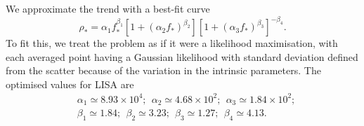 We approximate the trend with a best-fit curve
\begin{equation}
\rho_\ast = \alpha_1 f_\ast^{\beta_1} \left[1 + \left(\alpha_2 f_\ast\right)^{\beta_2}\right]\left[1 + \left(\alpha_3 f_\ast\right)^{\beta_3}\right]^{-\beta_4}.
\label{eq:scaled-SNR}
\end{equation}
To fit this, we treat the problem as if it were a likelihood maximisation, with each averaged point having a Gaussian likelihood with standard deviation defined from the scatter because of the variation in the intrinsic parameters. The optimised values for LISA are
\begin{equation}
\begin{split}
&\alpha_1 \simeq 8.93 \times 10^4; \ \  \alpha_2 \simeq 4.68 \times 10^2; \ \  \alpha_3 \simeq 1.84 \times 10^2;\\
&\beta_1 \simeq 1.84; \ \  \beta_2 \simeq 3.23; \ \  \beta_3 \simeq 1.27; \ \  \beta_4 \simeq 4.13.
\end{split}
\end{equation}

